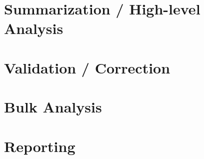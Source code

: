 \documentclass[11pt]{article}
\begin{document}
	\section{Summarization / High-level Analysis}\label{sec:sum_highlevel_analysis}
	
	\section{Validation / Correction}\label{sec:validation_correction}
	
	\section{Bulk Analysis}\label{sec:bulk_analysis}
	
	\section{Reporting}\label{sec:reporting}

	\newpage
	
\end{document}
